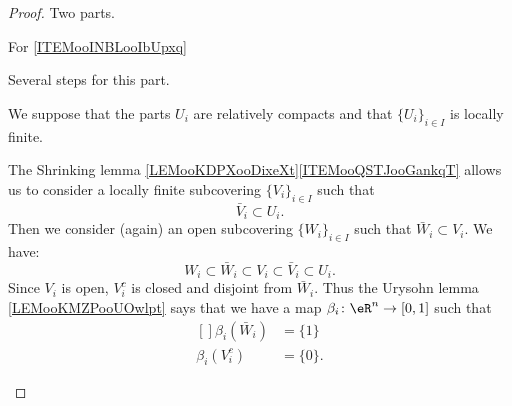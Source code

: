 \begin{proof}
	Two parts.
	\begin{proofpart}
		For \ref{ITEMooINBLooIbUpxq}
	\end{proofpart}

	Several steps for this part.
	\begin{subproof}
		We suppose that the parts \( U_i\) are relatively compacts and that \( \{ U_i \}_{i\in I}\) is locally finite.

		\begin{subproof}
			\spitem[Subcoverings]

			The Shrinking lemma \ref{LEMooKDPXooDixeXt}\ref{ITEMooQSTJooGankqT} allows us to consider a locally finite subcovering \( \{ V_i \}_{i\in I}\) such that
			\begin{equation}
				\bar V_i\subset U_i.
			\end{equation}
			Then we consider (again) an open subcovering \( \{ W_i \}_{i\in I}\) such that \( \bar W_i\subset V_i\). We have:
			\begin{equation}
				W_i\subset\bar W_i\subset V_i\subset \bar V_i\subset U_i.
			\end{equation}
			Since \( V_i\) is open, \( V_i^c\) is closed and disjoint from \( \bar W_i\). Thus the Urysohn lemma \ref{LEMooKMZPooUOwlpt} says that we have a map \(\beta_i \colon \eR^n\to \mathopen[ 0,1\mathclose]  \) such that
			\begin{equation}
				\begin{aligned}[]
					\beta_i(\bar W_i) & =\{ 1 \}  \\
					\beta_i(V_i^c)    & =\{ 0 \}.
				\end{aligned}
			\end{equation}


\end{subproof}
\end{subproof}
\end{proof}
